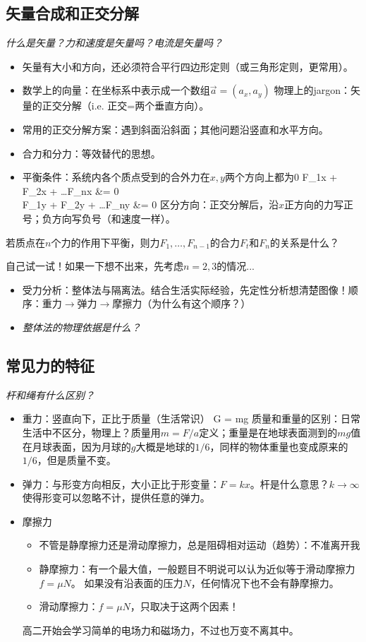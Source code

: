 \documentclass[a4paper,9pt]{ctexart}
\begin{document}
\subsection{矢量合成和正交分解}
\emph{什么是矢量？力和速度是矢量吗？电流是矢量吗？}
\begin{itemize}
\item
矢量有大小和方向，还必须符合平行四边形定则（或三角形定则，更常用）。
\item
数学上的向量：在坐标系中表示成一个数组$\vec a = (a_x,a_y)$ \so 物理上的jargon：矢量的正交分解（i.e. 正交=两个垂直方向）。
\item
常用的正交分解方案：遇到斜面沿斜面；其他问题沿竖直和水平方向。
\item
合力和分力：等效替代的思想。
\item
平衡条件：系统内各个质点受到的合外力在$x,y$两个方向上都为0
\bea
F_{1x} + F_{2x} + \dots F_{nx} &= 0 \\
F_{1y} + F_{2y} + \dots F_{ny} &= 0
\eea
区分方向：正交分解后，沿$x$正方向的力写正号；负方向写负号（和速度一样）。
\end{itemize}
\begin{eg}
若质点在$n$个力的作用下平衡，则力$F_1,\dots, F_{n-1}$的合力$F_t$和$F_n$的关系是什么？
\end{eg}
\begin{ans}
自己试一试！如果一下想不出来，先考虑$n=2,3$的情况...
\vspace{2cm}
\end{ans}
\begin{itemize}
\item
受力分析：整体法与隔离法。结合生活实际经验，先定性分析想清楚图像！顺序：重力$\to$弹力$\to$摩擦力（为什么有这个顺序？）
\item
\emph{整体法的物理依据是什么？}
\end{itemize}
\subsection{常见力的特征}
\emph{杆和绳有什么区别？}
\begin{itemize}
\item
重力：竖直向下，正比于质量（生活常识）
\beq
G = mg
\eeq
质量和重量的区别：日常生活中不区分，物理上？\so 质量用$m = F/a$定义；重量是在地球表面测到的$mg$值 \so 在月球表面，因为月球的$g$大概是地球的$1/6$，同样的物体重量也变成原来的$1/6$，但是质量不变。
\item
弹力：与形变方向相反，大小正比于形变量：$F = kx$。\so {}杆是什么意思？$k \to \infty$使得形变可以忽略不计，提供任意的弹力。
\item
摩擦力
\begin{itemize}
\item
不管是静摩擦力还是滑动摩擦力，总是阻碍相对运动（趋势）：不准离开我
\item
静摩擦力：有一个最大值，一般题目不明说可以认为近似等于滑动摩擦力$f = \mu N$。 \so 如果没有沿表面的压力$N$，任何情况下也不会有静摩擦力。
\item
滑动摩擦力：$f = \mu N$，只取决于这两个因素！
\end{itemize}
高二开始会学习简单的电场力和磁场力，不过也万变不离其中。
\end{itemize}
\end{document}
